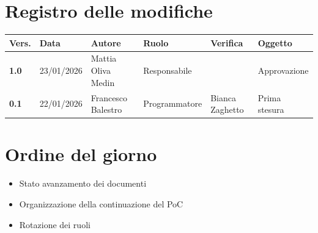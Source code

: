 \documentclass[a4paper,12pt]{article}
\begin{document}
    

    \newpage
    \section*{Registro delle modifiche}

    \begin{table}[h!]
        \begin{tabularx}{\textwidth}{|l|l|l|l|X|X|}
            \hline
            \textbf{Vers.} & \textbf{Data} & \textbf{Autore} & \textbf{Ruolo} & \textbf{Verifica} & \textbf{Oggetto} \\
            \hline
            \textbf{1.0} & 23/01/2026 & Mattia Oliva Medin & Responsabile & & Approvazione \\
            \hline
            \textbf{0.1} & 22/01/2026 & Francesco Balestro & Programmatore & Bianca Zaghetto & Prima stesura \\
        \hline
        \end{tabularx}
    \end{table}

    \newpage
    \tableofcontents
    \newpage

    \section{Ordine del giorno} {
        \begin{itemize}
            \item Stato avanzamento dei documenti
            \item Organizzazione della continuazione del PoC
            \item Rotazione dei ruoli
        \end{itemize}
    }
\end{document}

